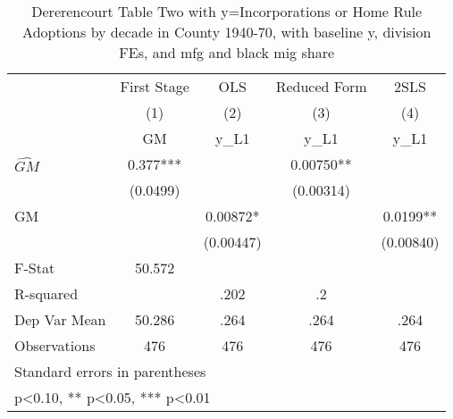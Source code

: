 \begin{table}[htbp]\centering
\def\sym#1{\ifmmode^{#1}\else\(^{#1}\)\fi}
\caption{Dererencourt Table Two with y=Incorporations or Home Rule Adoptions by decade in County 1940-70, with baseline y, division FEs, and mfg and black mig share}
\begin{tabular}{l*{4}{c}}
\toprule
                    & First Stage   &         OLS   &Reduced Form   &        2SLS   \\
                    &\multicolumn{1}{c}{(1)}&\multicolumn{1}{c}{(2)}&\multicolumn{1}{c}{(3)}&\multicolumn{1}{c}{(4)}\\
                    &\multicolumn{1}{c}{GM}&\multicolumn{1}{c}{y\_L1}&\multicolumn{1}{c}{y\_L1}&\multicolumn{1}{c}{y\_L1}\\
\midrule
$\hat{GM}$          &       0.377***&               &     0.00750** &               \\
                    &    (0.0499)   &               &   (0.00314)   &               \\
\addlinespace
GM                  &               &     0.00872*  &               &      0.0199** \\
                    &               &   (0.00447)   &               &   (0.00840)   \\
\midrule
F-Stat              &      50.572   &               &               &               \\
R-squared           &               &        .202   &          .2   &               \\
Dep Var Mean        &      50.286   &        .264   &        .264   &        .264   \\
Observations        &         476   &         476   &         476   &         476   \\
\bottomrule
\multicolumn{5}{l}{\footnotesize Standard errors in parentheses}\\
\multicolumn{5}{l}{\footnotesize * p<0.10, ** p<0.05, *** p<0.01}\\
\end{tabular}
\end{table}

